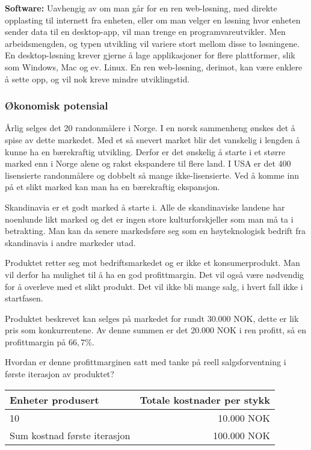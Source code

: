 \textbf{Software:}
Uavhengig av om man går for en ren web-løsning, med direkte opplasting til internett fra enheten, eller om man velger en løsning hvor enheten sender data til en desktop-app, vil man trenge en programvareutvikler.
Men arbeidsmengden, og typen utvikling vil variere stort mellom disse to løsningene.
En desktop-løsning krever gjerne å lage applikasjoner for flere plattformer, slik som Windows, Mac og ev. Linux.
En ren web-løsning, derimot, kan være enklere å sette opp, og vil nok kreve mindre utviklingstid.

\subsubsection{Økonomisk potensial}

Årlig selges det 20 randonmålere i Norge. I en norsk sammenheng ønskes det å spise av dette markedet. Med et så snevert market blir det vanskelig i lengden å kunne ha en bærekraftig utvikling. Derfor er det ønskelig å starte i et større marked enn i Norge alene og rakst ekspandere til flere land. I USA er det 400 lisensierte randonmålere og dobbelt så mange ikke-lisensierte. Ved å komme inn på et slikt marked kan man ha en bærekraftig ekspansjon.

Skandinavia er et godt marked å starte i. Alle de skandinaviske landene har noenlunde likt marked og det er ingen store kulturforskjeller som man må ta i betrakting. Man kan da senere markedsføre seg som en høyteknologisk bedrift fra skandinavia i andre markeder utad.

Produktet retter seg mot bedriftsmarkedet og er ikke et konsumerprodukt. Man vil derfor ha mulighet til å ha en god profittmargin. Det vil også være nødvendig for å overleve med et slikt produkt. Det vil ikke bli mange salg, i hvert fall ikke i startfasen.

Produktet beskrevet kan selges på markedet for rundt 30.000 NOK, dette er lik pris som konkurrentene. Av denne summen er det 20.000 NOK i ren profitt, så en profittmargin på $66,7 \%$.

Hvordan er denne profittmarginen satt med tanke på reell salgsforventning i første iterasjon av produktet?

\begin{table}[ht!]
    \begin{center}
    \begin{tabular}{ | l | r | }
        \hline
        Enheter produsert               & Totale kostnader per stykk \\
        \hline
        10                              & 10.000 NOK \\
        \hline
        Sum kostnad første iterasjon    & 100.000 NOK \\
        \hline
    \end{tabular}
    \end{center}
\end{table}

